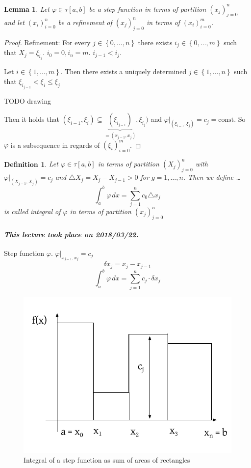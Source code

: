 \documentclass{article}
\newtheorem{definition}{Definition}  \numberwithin{definition}{section}
\newtheorem{lemma}{Lemma}  \numberwithin{lemma}{section}
\newcommand{\set}[1]{\left\{#1\right\}}
\newcommand{\dateref}[1]{\paragraph{\textit{This lecture took place on #1.}}}
\begin{document}
\begin{lemma}
  Let $\varphi \in \tau[a,b]$ be a step function in terms of partition $(x_j)_{j=0}^n$ and let $(x_i)_{i=0}^n$ be a refinement of $(x_j)_{j=0}^n$ in terms of $(x_i)_{i=0}^m$.
\end{lemma}

\begin{proof}
  Refinement: For every $j \in \set{0,\dots,n}$ there exists $i_j \in \set{0,\dots,m}$ such that $X_j = \xi_{i_j}$.
  $i_0 = 0, i_n = m$. $i_{j-1} < i_j$.

  Let $i \in \set{1, \dots, m}$. Then there exists a uniquely determined $j \in \set{1, \dots, n}$ such that $\xi_{i_{j-1}} < \xi_i \leq \xi_j$

  TODO drawing %

  Then it holds that $(\xi_{i-1}, \xi_i) \subseteq \underbrace{(\xi_{i_{j-1}})}_{= (x_{j-1}, x_j)}, \xi_{i_j})$ and $\varphi|_{(\xi_{i-1}, \xi_j)} = c_j = \text{const}$. So $\varphi$ is a subsequence in regards of $(\xi_i)_{i=0}^m$.
\end{proof}

\begin{definition}
  Let $\varphi \in \tau[a,b]$ in terms of partition $(X_j)_{j=0}^n$ with $\varphi|_{(X_{j-1}, X_j)} = c_j$ and $\triangle X_j = X_j - X_{j-1} > 0$ for $g = 1,\dots,n$. Then we define \dots
  \[ \int_a^b \varphi \, dx = \sum_{j=1}^n c_0 \triangle x_j \]
  is called \emph{integral of $\varphi$} in terms of partition $(x_j)_{j=0}^n$
\end{definition}

\dateref{2018/03/22}

Step function $\varphi$. $\varphi|_{x_{j-1},x_j} = c_j$
\[ \delta x_j = x_j - x_{j-1} \]
\[ \int_a^b \varphi \, dx = \sum_{j=1}^n c_j \cdot \delta x_j \]

\begin{figure}[!h]
  \begin{center}
    \includegraphics{img/12_integral_of_a_step_function.pdf}
    \caption{Integral of a step function as sum of areas of rectangles}
  \end{center}
\end{figure}
\end{document}
